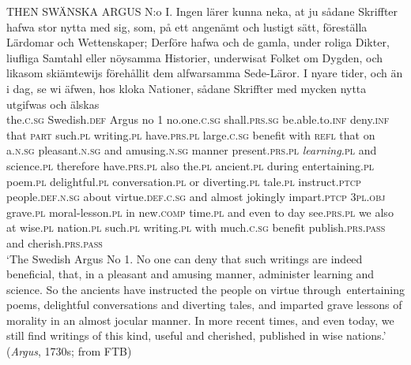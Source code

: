 \documentclass[output=paper]{langscibook}
\begin{document}
\ea        \label{ex:intro:3}
\gll  THEN   SWÄNSKA     ARGUS   N:o I.     Ingen         lärer  kunna         neka,     at     ju       sådane   Skriffter hafwa         stor       nytta     med   sig,   som,   på   ett     angenämt   och lustigt         sätt,     föreställa       Lärdomar   och Wettenskaper;   Derföre hafwa         och de     gamla,     under   roliga         Dikter, liufliga       Samtahl         eller   nöysamma   Historier, underwisat Folket           om   Dygden,        och   likasom   skiämtewijs   förehållit dem       alfwarsamma   Sede-Läror.      I  nyare       tider,    och   än     i   dag, se             wi   äfwen, hos kloka     Nationer,   sådane   Skriffter med   mycken     nytta       utgifwas         och   älskas\\
  the.\textsc{c.sg}   Swedish\textsc{.def} Argus   no 1  no.one.\textsc{c.sg}   shall\textsc{.prs.sg} be.able.to.\textsc{inf}  deny.\textsc{inf}   that   \textsc{part}  such.\textsc{pl}  writing.\textsc{pl}  have.\textsc{prs.pl}   large.\textsc{c.sg}  benefit  with  \textsc{refl}  that  on    a.\textsc{n.sg}  pleasant.\textsc{n.sg}  and amusing.\textsc{n.sg}   manner  present.\textsc{prs.pl}    \textit{learning.}\textsc{pl}  and science.\textsc{pl}    therefore have.\textsc{prs.pl}   also the.\textsc{pl}  ancient\textsc{.pl}  during  entertaining.\textsc{pl}  poem.\textsc{pl} delightful.\textsc{pl}  conversation.\textsc{pl}   or    diverting.\textsc{pl}  tale.\textsc{pl}  instruct.\textsc{ptcp} people.\textsc{def.n.sg}  about  virtue.\textsc{def.c.sg}  and  almost  jokingly    impart.\textsc{ptcp} \textsc{3pl.obj}  grave.\textsc{pl}      moral-lesson\textsc{.pl}  in   new.\textsc{comp}  time.\textsc{pl}  and  even to   day see.\textsc{prs.pl}   we   also     at  wise.\textsc{pl}  nation.\textsc{pl}  such.\textsc{pl}   writing.\textsc{pl} with   much\textsc{.c.sg}   benefit   publish.\textsc{prs.pass}   and  cherish.\textsc{prs.pass}\\
\glt ‘The Swedish Argus No 1. No one can deny that such writings are indeed beneficial, that, in a pleasant and amusing manner, administer learning and science. So the ancients have instructed the people on virtue through~entertaining poems, delightful conversations and diverting tales, and imparted grave lessons of morality in an almost jocular manner. In more recent times, and even today, we still find writings of this kind, useful and cherished, published in wise nations.’ (\textit{Argus}, 1730s; from FTB)
\z
\end{document}
